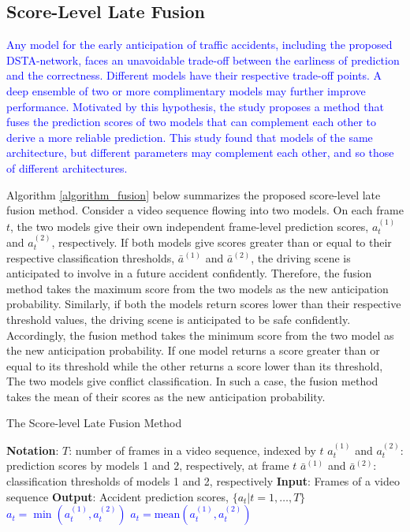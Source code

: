 \documentclass[journal]{IEEEtran}
\begin{document}
\subsection{Score-Level Late Fusion}
\label{subsec_fusion}

\textcolor{blue}{Any model for the early anticipation of traffic accidents, including the proposed DSTA-network, faces an unavoidable trade-off between the earliness of prediction and the correctness. Different models have their respective trade-off points. A deep ensemble of two or more complimentary models may further improve performance. Motivated by this hypothesis, the study proposes a method that fuses the prediction scores of two models that can complement each other to derive a more reliable prediction. This study found that models of the same architecture, but different parameters may complement each other, and so those of different architectures.}

Algorithm \ref{algorithm_fusion} below summarizes the proposed score-level late fusion method. Consider a video sequence flowing into two models. On each frame $t$, the two models give their own independent frame-level prediction scores, $a_t^{(1)}$ and $a_t^{(2)}$, respectively. If both models give scores greater than or equal to their respective classification thresholds, $\bar{a}^{(1)}$ and $\bar{a}^{(2)}$, the driving scene is anticipated to involve in a future accident confidently. Therefore, the fusion method takes the maximum score from the two models as the new anticipation probability. Similarly, if both the models return scores lower than their respective threshold values, the driving scene is anticipated to be safe confidently. Accordingly, the fusion method takes the minimum score from the two model as the new anticipation probability. If one model returns a score greater than or equal to its threshold while the other returns a score lower than its threshold, The two models give conflict classification. In such a case, the fusion method takes the mean of their scores as the new anticipation probability. 


\begin{algorithm}
\caption{The Score-level Late Fusion Method}\begin{algorithmic}
\STATE \textbf{Notation}: 
\STATE $T$: number of frames in a video sequence, indexed by $t$
\STATE $a_t^{(1)}$ and $a_t^{(2)}$: prediction scores by models 1 and 2, respectively, at frame $t$ 
\STATE $\bar{a}^{(1)}$ and $\bar{a}^{(2)}$: classification thresholds of models 1 and 2, respectively
\STATE\textbf{Input}: Frames of a video sequence
\STATE \textbf{Output}: Accident prediction scores, $\{a_t|t=1,\dots, T\}$
\vspace{0.03in}
\STATE\textcolor{blue}{{$a_t = \min(a_t^{(1)},a_t^{(2)})$}}
\ELSE 
\STATE\textcolor{blue}{{$a_t = \text{mean}(a_t^{(1)},a_t^{(2)})$}}
\ENDIF
\ENDFOR
\end{algorithmic}
\label{algorithm_fusion}
\end{algorithm}
\end{document}
